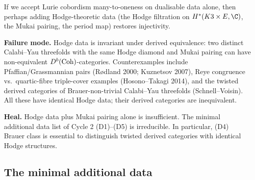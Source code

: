 If we accept Lurie cobordism many-to-oneness on dualisable data alone,
then perhaps adding Hodge-theoretic data (the Hodge filtration on
$H^*(K3\times E,\C)$, the Mukai pairing, the period map) restores
injectivity.

\textbf{Failure mode.} Hodge data is invariant under derived
equivalence: two distinct Calabi--Yau threefolds with the same Hodge
diamond and Mukai pairing can have non-equivalent
$D^b(\mathrm{Coh})$-categories. Counterexamples include Pfaffian/Grassmannian
pairs (R{\o}dland 2000; Kuznetsov 2007), Reye congruence vs.\
quartic-fibre triple-cover examples (Hosono--Takagi 2014), and the
twisted derived categories of Brauer-non-trivial Calabi--Yau threefolds
(Schnell--Voisin). All these have identical Hodge data; their derived
categories are inequivalent.

\textbf{Heal.} Hodge data plus Mukai pairing alone is insufficient. The
minimal additional data list of Cycle 2 (D1)--(D5) is irreducible. In
particular, (D4) Brauer class is essential to distinguish twisted
derived categories with identical Hodge structures.

\subsection{The minimal additional data}
\label{wn:subsec:agent08-minimal-data}

